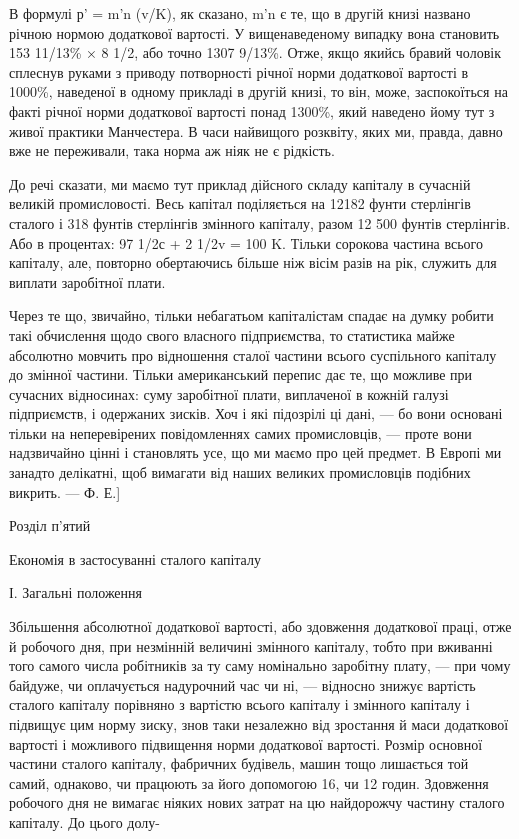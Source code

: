 В формулі р' = m'n (v/K), як сказано, m'n є те, що в другій
книзі названо річною нормою додаткової вартості. У вищенаведеному
випадку вона становить 153 11/13\% × 8 1/2, або точно
1307 9/13\%. Отже, якщо якийсь бравий чоловік сплеснув руками
з приводу потворності річної норми додаткової вартості в 1000\%,
наведеної в одному прикладі в другій книзі, то він, може, заспокоїться
на факті річної норми додаткової вартості понад
1300\%, який наведено йому тут з живої практики Манчестера.
В часи найвищого розквіту, яких ми, правда, давно вже не переживали,
така норма аж ніяк не є рідкість.

До речі сказати, ми маємо тут приклад дійсного складу капіталу
в сучасній великій промисловості. Весь капітал поділяється на
12182 фунти стерлінгів сталого і 318 фунтів стерлінгів змінного
капіталу, разом 12 500 фунтів стерлінгів. Або в процентах:
97 1/2с + 2 1/2v = 100 K. Тільки сорокова частина всього капіталу,
але, повторно обертаючись більше ніж вісім разів на рік, служить
для виплати заробітної плати.

Через те що, звичайно, тільки небагатьом капіталістам спадає
на думку робити такі обчислення щодо свого власного підприємства,
то статистика майже абсолютно мовчить про відношення
сталої частини всього суспільного капіталу до змінної
частини. Тільки американський перепис дає те, що можливе при
сучасних відносинах: суму заробітної плати, виплаченої в кожній
галузі підприємств, і одержаних зисків. Хоч і які підозрілі ці
дані, — бо вони основані тільки на неперевірених повідомленнях
самих промисловців, — проте вони надзвичайно цінні і становлять
усе, що ми маємо про цей предмет. В Европі ми занадто делікатні,
щоб вимагати від наших великих промисловців подібних
викрить. — Ф. Е.]

Розділ п’ятий

Економія в застосуванні сталого капіталу

І. Загальні положення

Збільшення абсолютної додаткової вартості, або здовження
додаткової праці, отже й робочого дня, при незмінній величині
змінного капіталу, тобто при вживанні того самого числа робітників
за ту саму номінально заробітну плату, — при чому байдуже,
чи оплачується надурочний час чи ні, — відносно знижує
вартість сталого капіталу порівняно з вартістю всього капіталу
і змінного капіталу і підвищує цим норму зиску, знов таки
незалежно від зростання й маси додаткової вартості і можливого
підвищення норми додаткової вартості. Розмір основної
частини сталого капіталу, фабричних будівель, машин тощо лишається
той самий, однаково, чи працюють за його допомогою 16,
чи 12 годин. Здовження робочого дня не вимагає ніяких нових
затрат на цю найдорожчу частину сталого капіталу. До цього долу-
